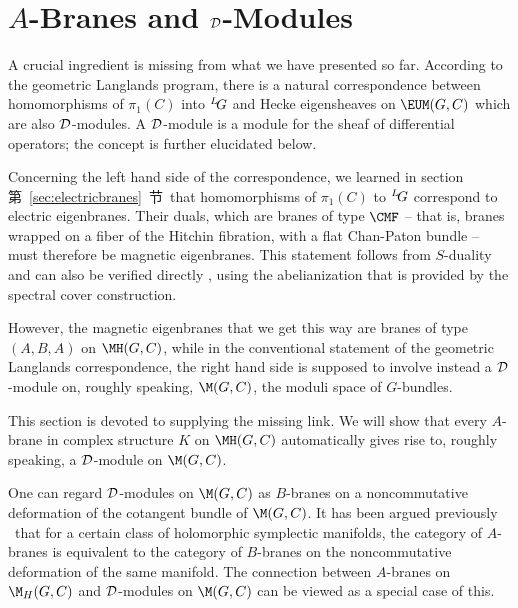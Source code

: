 
\section{$A$-Branes and ${\cal D}$-Modules}
\label{sec:abranes}

 
  

  
  

  

  

A crucial ingredient is missing from what we have presented so
far. According to the geometric Langlands program, there is a
natural correspondence between homomorphisms of $\pi_1(C)$ into
$^L\negthinspace G$ and Hecke eigensheaves on ${\EUM}(G,C)$ which
are also ${\cal D}$-modules.  A ${\cal D}$-module is a module for
the sheaf of differential operators; the concept is further
elucidated below.

Concerning the left hand side of the correspondence, we learned in
section 第~\ref{sec:electricbranes}~节\ that homomorphisms of $\pi_1(C)$ to
$^L\negthinspace G$ correspond to electric eigenbranes.  Their
duals, which are branes of type ${\CMF}$ -- that is, branes
wrapped on a fiber of the Hitchin fibration, with a flat
Chan-Paton bundle -- must therefore be magnetic eigenbranes.
This statement follows from $S$-duality and can also be verified
directly \cite{ref26}, using  the abelianization that is provided by
the spectral cover construction.

However, the magnetic eigenbranes that we get this way are branes
of type $(A,B,A)$ on $\MH(G,C)$, while in the conventional
statement of the geometric Langlands correspondence, the right
hand side is supposed to involve instead a ${\cal D}$-module on,
roughly speaking, $\M(G,C)$, the moduli space of $G$-bundles.

This section is devoted to supplying the missing link. We will
show that every $A$-brane in complex structure $K$ on $\MH(G,C)$
automatically gives rise to, roughly speaking, a ${\cal D}$-module
on $\M(G,C)$.

One can regard ${\cal D}$-modules on $\M(G,C)$ as $B$-branes on a
noncommutative deformation of the cotangent bundle of $\M(G,C)$.
It has been argued previously \cite{ref41}\ that for a certain class of
holomorphic symplectic manifolds, the category of $A$-branes is
equivalent to the category of $B$-branes on the noncommutative
deformation of the same manifold. The connection between
$A$-branes on $\M_H(G,C)$ and $\cal D$-modules on $\M(G,C)$ can be
viewed as a special case of this.

